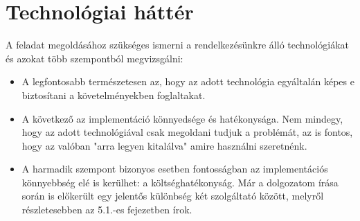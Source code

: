 \chapter{Technológiai háttér}
A feladat megoldásához szükséges ismerni a rendelkezésünkre álló technológiákat és azokat több szempontból megvizsgálni:
\begin{itemize}
    \item A legfontosabb természetesen az, hogy az adott technológia egyáltalán képes e biztosítani a követelményekben foglaltakat.
    \item A következő az implementáció könnyedsége és hatékonysága. Nem mindegy, hogy az adott technológiával csak megoldani tudjuk a problémát, az is fontos, hogy az valóban "arra legyen kitalálva" amire használni szeretnénk.
    \item A harmadik szempont bizonyos esetben fontosságban az implementációs könnyebbség elé is kerülhet: a költséghatékonyság. Már a dolgozatom írása során is előkerült egy jelentős különbség két szolgáltató között, melyről részletesebben az 5.1.-es fejezetben írok.
\end{itemize}
